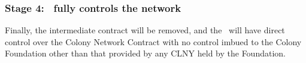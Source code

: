 \subsubsection*{Stage 4: \rc\ fully controls the network}
Finally, the intermediate contract will be removed, and the \rc\ will have direct control over the Colony Network Contract with no control imbued to the Colony Foundation other than that provided by any CLNY held by the Foundation. 

